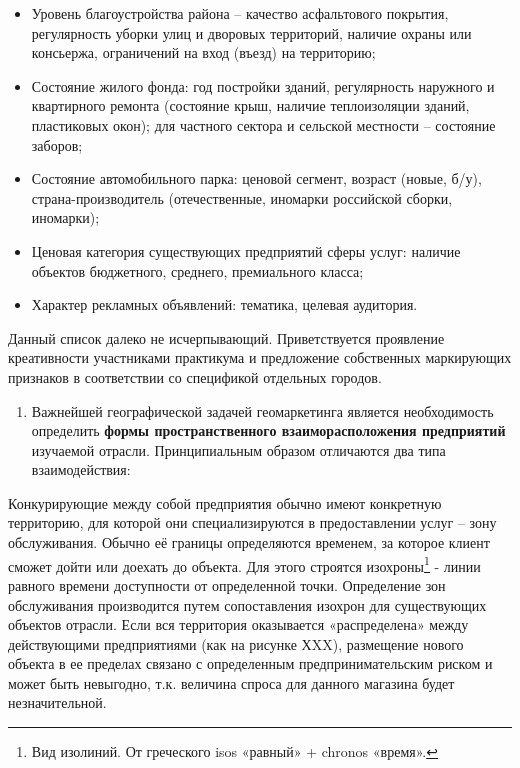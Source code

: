 \documentclass[
  11pt,
  russian,
]{book}
\providecommand{\tightlist}{%
  \setlength{\itemsep}{0pt}\setlength{\parskip}{0pt}}
\begin{document}
\begin{itemize}
\tightlist
\item
  Уровень благоустройства района -- качество асфальтового покрытия, регулярность уборки улиц и дворовых территорий, наличие охраны или консьержа, ограничений на вход (въезд) на территорию;
\item
  Состояние жилого фонда: год постройки зданий, регулярность наружного и квартирного ремонта (состояние крыш, наличие теплоизоляции зданий, пластиковых окон); для частного сектора и сельской местности -- состояние заборов;
\item
  Состояние автомобильного парка: ценовой сегмент, возраст (новые, б/у), страна-производитель (отечественные, иномарки российской сборки, иномарки);
\item
  Ценовая категория существующих предприятий сферы услуг: наличие объектов бюджетного,
  среднего, премиального класса;
\item
  Характер рекламных объявлений: тематика, целевая аудитория.
\end{itemize}

Данный список далеко не исчерпывающий.
Приветствуется проявление креативности участниками практикума и предложение
собственных маркирующих признаков в соответствии со спецификой отдельных
городов.

\begin{enumerate}
\def\labelenumi{\arabic{enumi}.}
\setcounter{enumi}{2}
\tightlist
\item
  Важнейшей географической задачей геомаркетинга является необходимость определить \textbf{формы пространственного взаиморасположения предприятий} изучаемой отрасли. Принципиальным образом отличаются два типа взаимодействия:
\end{enumerate}

Конкурирующие между собой предприятия обычно имеют конкретную территорию, для которой они специализируются в
предоставлении услуг -- зону обслуживания. Обычно её границы определяются временем, за которое клиент сможет дойти или доехать до объекта. Для этого строятся изохроны\footnote{Вид изолиний. От греческого isos «равный» + chronos «время».} - линии равного времени доступности от определенной точки. Определение зон
обслуживания производится путем сопоставления изохрон для существующих объектов отрасли. Если вся территория оказывается «распределена» между действующими предприятиями (как на рисунке ХXX), размещение нового объекта в ее
пределах связано с определенным предпринимательским риском и может быть
невыгодно, т.к. величина спроса для данного магазина будет незначительной.
\end{document}
